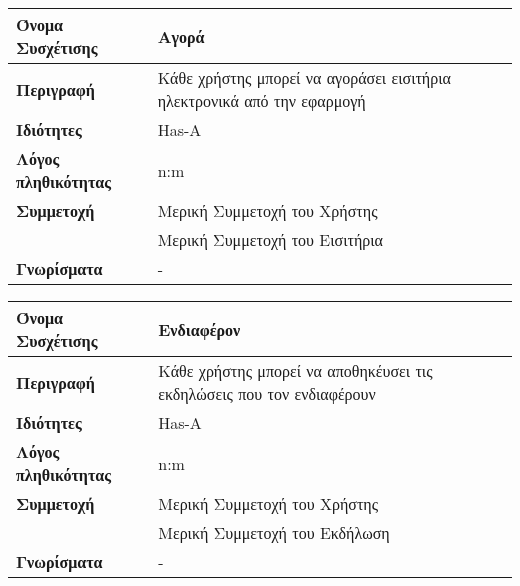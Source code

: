 \begin{center}
\begin{tabular}[]{|p{4cm}|p{10cm}|}
  \hline
  \textbf{Όνομα Συσχέτισης}   & Αγορά                                                                  \\  \hline
  \textbf{Περιγραφή}          & Κάθε χρήστης μπορεί να αγοράσει εισιτήρια ηλεκτρονικά από την εφαρμογή \\ \hline
  \textbf{Ιδιότητες}          & Has-A                                                                  \\ \hline
  \textbf{Λόγος πληθικότητας} & n:m                                                                    \\ \hline
  \textbf{Συμμετοχή}          & Mερική Συμμετοχή του Χρήστης                                           \\ \cline{2-2}
                              & Μερική Συμμετοχή του Εισιτήρια                                          \\ \hline
  \textbf{Γνωρίσματα}         & -                                                                       \\ \hline
\end{tabular}
\vspace{0.3 cm}






\begin{tabular}[]{|p{4cm}|p{10cm}|}
  \hline
  \textbf{Όνομα Συσχέτισης} & Ενδιαφέρον \\  \hline
  \textbf{Περιγραφή} & Κάθε χρήστης μπορεί να αποθηκέυσει τις εκδηλώσεις που τον ενδιαφέρουν \\ \hline
  \textbf{Ιδιότητες} & Has-A \\ \hline
  \textbf{Λόγος πληθικότητας} & n:m \\ \hline
  \textbf{Συμμετοχή} & Mερική Συμμετοχή του Χρήστης \\ \cline{2-2}
                     & Μερική Συμμετοχή του Εκδήλωση \\ \hline
  \textbf{Γνωρίσματα} & - \\ \hline
\end{tabular}
\vspace{0.3 cm}


\end{center}
